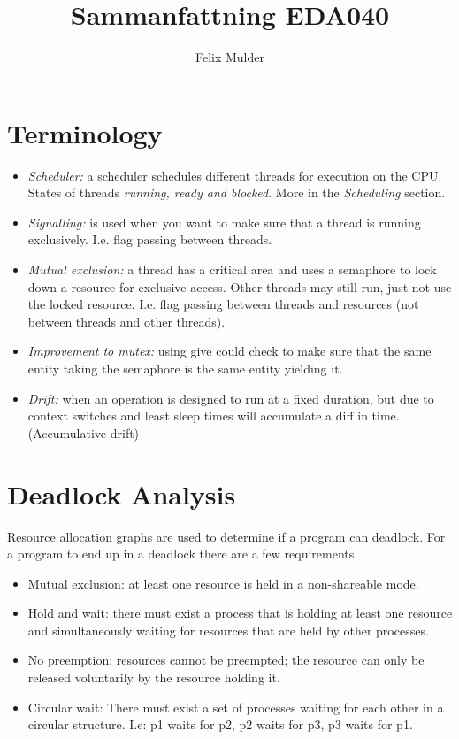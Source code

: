 \documentclass[a4paper]{article}
\title{Sammanfattning EDA040}
\author{Felix Mulder}
\begin{document}
\maketitle
\thispagestyle{empty}
\newpage
\setcounter{page}{1}

\section{Terminology}
\begin{itemize}
  \item \emph{Scheduler:} a scheduler schedules different threads for execution
        on the CPU. States of threads \emph{running, ready and blocked}. More
        in the \emph{Scheduling} section.
  \item \emph{Signalling:} is used when you want to make sure that a thread is
        running exclusively. I.e. flag passing between threads.
  \item \emph{Mutual exclusion:} a thread has a critical area and uses a semaphore
        to lock down a resource for exclusive access. Other threads may still
        run, just not use the locked resource. I.e. flag passing between threads
        and resources (not between threads and other threads).
  \item \emph{Improvement to mutex:} using give could check to make sure that the
        same entity taking the semaphore is the same entity yielding it.
  \item \emph{Drift:} when an operation is designed to run at a fixed duration,
        but due to context switches and least sleep times will accumulate a diff
        in time. (Accumulative drift)
\end{itemize}

\section{Deadlock Analysis}
Resource allocation graphs are used to determine if a program can deadlock.
For a program to end up in a deadlock there are a few requirements.
\begin{itemize}
  \item Mutual exclusion: at least one resource is held in a non-shareable mode.
  \item Hold and wait: there must exist a process that is holding at least one
        resource and simultaneously waiting for resources that are held by other
        processes.
  \item No preemption: resources cannot be preempted; the resource can only be 
        released voluntarily by the resource holding it.
  \item Circular wait: There must exist a set of processes waiting for each other
        in a circular structure. I.e: p1 waits for p2, p2 waits for p3, p3 waits
        for p1.
\end{itemize}
\end{document}
